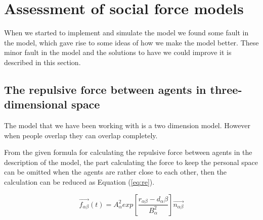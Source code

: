 \section{Assessment of social force models}
\label{sec:assessment}
When we started to implement and simulate the model we found some fault
in the model, which gave rise to some ideas of how we make the model better.
These minor fault in the model and the solutions to have we could improve it
is described in this section.

\subsection{The repulsive force between agents in three-dimensional space}
The model that we have been working with is a two dimension model. However when 
people overlap they can overlap completely. 

From the given formula for calculating the repulsive force between agents in the 
description of the model, the part calculating the force to keep the personal space 
can be omitted when the agents are rather close to each other, then the calculation 
can be reduced as Equation (\ref{eq:re}).

\begin{equation}\label{eq:re}
\overrightarrow{f_{\alpha\beta}}(t) = A_{\alpha}^{2} exp\left[ \frac{r_{\alpha\beta} - d_{\alpha}\beta}{B_{\alpha}^{2}}\right]  \overrightarrow{n_{\alpha\beta}}
\end{equation}

